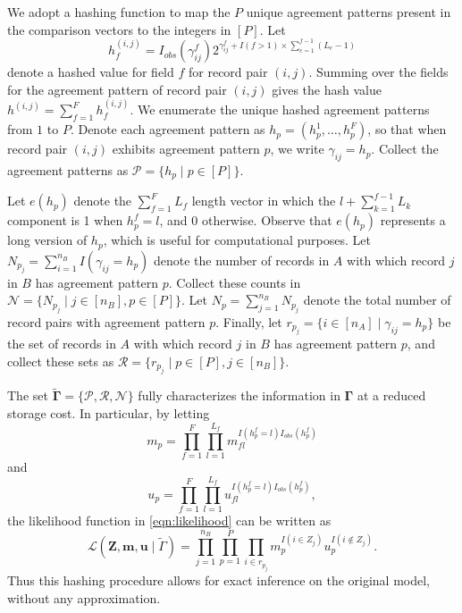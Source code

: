 \documentclass[12pt,letterpaper]{article}
\newcommand{\1}[1]{\mathbb{I}\!\left[#1\right]} %
\begin{document}
We adopt a hashing function to map the $P$ unique agreement patterns present in the comparison vectors to the integers in $[P]$. Let
\begin{equation*}
	h_f^{(i,j)} = I_{obs}( \gamma_{ij}^f) 2^{\gamma_{ij}^f + I(f>1) \times \sum_{e=1}^{f-1}(L_{e} - 1)}
\end{equation*}
denote a hashed value for field $f$ for record pair $(i,j)$. Summing over the fields for the agreement pattern of record pair $(i,j)$ gives the hash value $h^{(i,j)}=\sum_{f=1}^Fh_f^{(i,j)}$. We enumerate the unique hashed agreement patterns from $1$ to $P$. Denote each agreement pattern as $h_p=(h_p^1,\dots,h_p^F)$, so that when record pair $(i,j)$ exhibits agreement pattern $p$, we write $\gamma_{ij}=h_p$.  Collect the agreement patterns as $\mathcal{P}=\{h_p\mid p\in[P]\}$.

Let $e(h_p)$ denote the $\sum_{f=1}^FL_f$ length vector in which the $l + \sum_{k=1}^{f-1} L_k$ component is 1 when $h_p^f = l$, and 0 otherwise. Observe that $e(h_p)$ represents a long version of $h_p$, which is useful for computational purposes. Let $N_{p_j}=\sum_{i=1}^{n_B}I(\gamma_{ij}=h_p)$ denote the number of records in $A$ with which record $j$ in $B$ has agreement pattern $p$. Collect these counts in $\mathcal{N}=\{N_{p_j}\mid j\in[n_B], p\in[P]\}.$ Let $N_p=\sum_{j=1}^{n_B}N_{p_j}$ denote the total number of record pairs with agreement pattern $p$. Finally, let $r_{p_j}=\{i\in[n_A]\mid \gamma_{ij}=h_p\}$ be the set of records in $A$ with which record $j$ in $B$ has agreement pattern $p$, and collect these sets as $\mathcal{R}=\{r_{p_j}\mid p\in[P], j\in[n_B]\}$. 

The set $\tilde{\bm{\Gamma}}=\{ \mathcal{P}, \mathcal{R},\mathcal{N}\}$ fully characterizes the information in $\bm{\Gamma}$ at a reduced storage cost. In particular, by letting 
\[
m_p = \prod_{f=1}^F\prod_{l=1}^{L_f} m_{fl}^{I(h_p^{f}=l)I_{obs}(h_p^{f})}
\]
and
\[
u_p = \prod_{f=1}^F\prod_{l=1}^{L_f} u_{fl}^{I(h_p^{f}=l)I_{obs}(h_p^{f})},
\]
the likelihood function in \eqref{eqn:likelihood} can be written as
\begin{equation}
	\label{eq:likelihood-hash}
	\mathcal{L}(\bm{Z}, \bm{m}, \bm{u} \mid \tilde{\Gamma}) = \prod_{j=1}^{n_B} \prod_{p=1}^{P} \prod_{i\in r_{p_j}} m_p^{I(i \in Z_j)} u_{p}^{I(i \notin Z_j)}.
\end{equation}
Thus this hashing procedure allows for exact inference on the original model, without any approximation.
\end{document}
